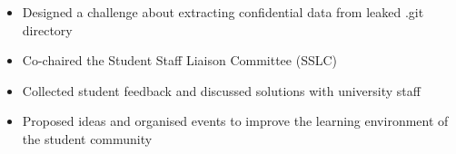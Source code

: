 \documentclass{resume}
\begin{document}
\begin{itemize}
  \item Designed a challenge about extracting confidential data from leaked .git directory
\end{itemize}


\begin{itemize}
  \item Co-chaired the Student Staff Liaison Committee (SSLC)
  \item Collected student feedback and discussed solutions with university staff
  \item Proposed ideas and organised events to improve the learning environment of the student community
\end{itemize}



\end{document}
